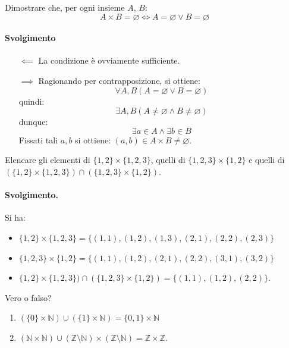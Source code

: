 \begin{exsbox}
	Dimostrare che, per ogni insieme $A$, $B$:
	\begin{displaymath}
		A \times B = \varnothing \iff A = \varnothing \vee B = \varnothing
	\end{displaymath}
\end{exsbox}
\paragraph{Svolgimento}
\begin{itemize}
\item[$\impliedby$] La condizione è ovviamente sufficiente.	
\item[$\implies$] Ragionando per contrapposizione, si ottiene:
\begin{displaymath}
	\forall A,B (A = \varnothing \vee B = \varnothing)
\end{displaymath}
quindi:
\begin{displaymath}
	\exists A,B (A \neq \varnothing \wedge B \neq \varnothing)
\end{displaymath}
dunque:
\begin{displaymath}
	\exists a \in A \wedge \exists b \in B
\end{displaymath}
Fissati tali $a,b$ si ottiene:	$(a,b) \in A \times B \neq \varnothing$.\hfill \blacksquare
\end{itemize}
\begin{exsbox}
	Elencare gli elementi di $\{1,2 \} \times \{1,2,3\}$, quelli di $\{1,2,3 \} \times \{1,2\}$ e quelli di $( \{1,2\} \times \{1,2,3\} ) \cap ( \{1,2,3\} \times \{1,2\})$.
\end{exsbox}
\paragraph{Svolgimento.} Si ha:
\begin{itemize}
	\item $\{1,2 \} \times \{1,2,3\} = \{(1,1),(1,2),(1,3),(2,1),(2,2),(2,3)\}$
	\item $\{1,2,3 \} \times \{1,2\} = \{(1,1),(1,2),(2,1),(2,2),(3,1),(3,2)\}$
	\item $\{1,2\} \times \{1,2,3\} ) \cap ( \{1,2,3\} \times \{1,2\}) = \{(1,1),(1,2),(2,2)\}$. \hfill \blacksquare
\end{itemize}
\begin{exsbox}
	Vero o falso?
	\begin{enumerate}
		\item $(\{0\}\times \mathbb{N}) \cup (\{1\}\times \mathbb{N}) = \{0,1\} \times \mathbb{N}$
		\item $(\mathbb{N} \times \mathbb{N}) \cup (\mathbb{Z} \setminus \mathbb{N}) \times (\mathbb{Z}\setminus \mathbb{N}) = \mathbb{Z} \times \mathbb{Z}$.
	\end{enumerate}
\end{exsbox}
